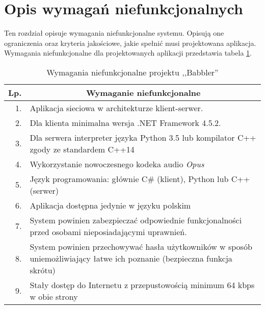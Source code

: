 \section{Opis wymagań niefunkcjonalnych}
Ten rozdział opisuje wymagania niefunkcjonalne systemu. Opisują one ograniczenia oraz kryteria jakościowe, jakie spełnić musi projektowana aplikacja. Wymagania niefunkcjonalne dla projektowanych aplikacji przedstawia tabela \ref{tab:wymniefun}.

\begin{table}[!hbp]
	\centering
	\caption{Wymagania niefunkcjonalne projektu ,,Babbler''}
	\label{tab:wymniefun}
	\begin{tabularx}{\textwidth}{|r|X|} \hline
		\multicolumn{1}{|c|}{\textbf{Lp.}} & \multicolumn{1}{|c|}{\textbf{Wymaganie niefunkcjonalne}} \\ \hline
		1. & Aplikacja sieciowa w architekturze klient-serwer. \\ \hline
		2. & Dla klienta minimalna wersja .NET Framework 4.5.2. \\ \hline
		3. & Dla serwera interpreter języka Python 3.5 lub kompilator C++ zgody ze standardem C++14 \\ \hline
		4. & Wykorzystanie nowoczesnego kodeka audio \textit{Opus} \\ \hline
		5. & Język programowania: głównie C\# (klient), Python lub C++ (serwer) \\ \hline
		6. & Aplikacja dostępna jedynie w języku polskim \\ \hline
		7. & System powinien zabezpieczać odpowiednie funkcjonalności przed osobami nieposiadającymi uprawnień. \\ \hline
		8. & System powinien przechowywać hasła użytkowników w sposób uniemożliwiający łatwe ich poznanie (bezpieczna funkcja skrótu) \\ \hline
		9. & Stały dostęp do Internetu z przepustowością minimum 64 kbps w obie strony \\ \hline
	\end{tabularx}
\end{table}
